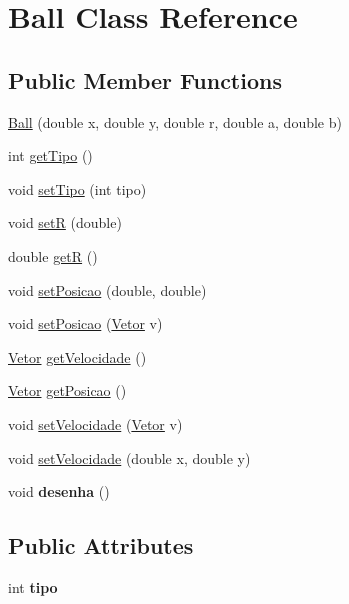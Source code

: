 \hypertarget{classBall}{\section{\-Ball \-Class \-Reference}
\label{classBall}
}
\subsection*{\-Public \-Member \-Functions}
\begin{DoxyCompactItemize}
\item 
\hyperlink{classBall_a397adca6e1250bd60283f10b767519dc}{\-Ball} (double x, double y, double r, double a, double b)
\item 
int \hyperlink{classBall_a0f4375adc33802bce14335ae51b4b590}{get\-Tipo} ()
\item 
void \hyperlink{classBall_ad09271738076c152d096e3b01f17db38}{set\-Tipo} (int tipo)
\item 
void \hyperlink{classBall_a1e924ceceadecb876124b9b4a6ae9234}{set\-R} (double)
\item 
double \hyperlink{classBall_af4d11372f2bbc663a2beea5b023e28bf}{get\-R} ()
\item 
void \hyperlink{classBall_a881c25c6aa04c635020f43283e5ecc75}{set\-Posicao} (double, double)
\item 
void \hyperlink{classBall_ad6f2d5c2e00b3165ad872005dac55730}{set\-Posicao} (\hyperlink{classVetor}{\-Vetor} v)
\item 
\hyperlink{classVetor}{\-Vetor} \hyperlink{classBall_a0b1f6d18c48702b20cd71f988408e377}{get\-Velocidade} ()
\item 
\hyperlink{classVetor}{\-Vetor} \hyperlink{classBall_aec6a24e92df23d237cdc11ad4619a96d}{get\-Posicao} ()
\item 
void \hyperlink{classBall_aa9eee311951e8edc3dddf4dd0852c7ef}{set\-Velocidade} (\hyperlink{classVetor}{\-Vetor} v)
\item 
void \hyperlink{classBall_a8faf3c86f2c9d2d6ec2f3f36aecdc155}{set\-Velocidade} (double x, double y)
\item 
\hypertarget{classBall_a061c257f2d562aa2a8761a919a2aa5ab}{void {\bfseries desenha} ()}\label{classBall_a061c257f2d562aa2a8761a919a2aa5ab}

\end{DoxyCompactItemize}
\subsection*{\-Public \-Attributes}
\begin{DoxyCompactItemize}
\item 
\hypertarget{classBall_ab0b984ed19efa6999e6d4064cfa26f9c}{int {\bfseries tipo}}\label{classBall_ab0b984ed19efa6999e6d4064cfa26f9c}

\end{DoxyCompactItemize}


